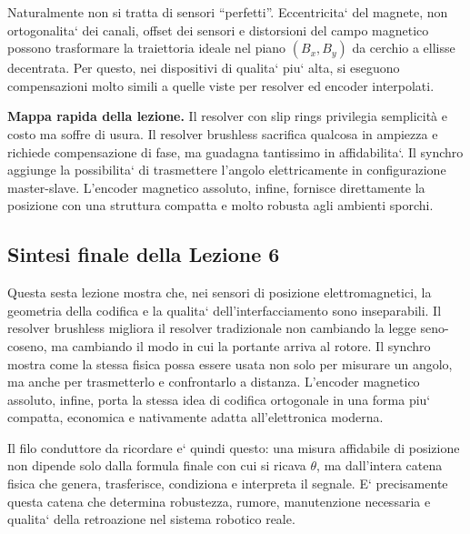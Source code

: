 \documentclass[11pt,a4paper]{article}
\begin{document}
Naturalmente non si tratta di sensori ``perfetti''. Eccentricita` del magnete, non ortogonalita` dei canali, offset dei sensori e distorsioni del campo magnetico possono trasformare la traiettoria ideale nel piano \((B_x,B_y)\) da cerchio a ellisse decentrata. Per questo, nei dispositivi di qualita` piu` alta, si eseguono compensazioni molto simili a quelle viste per resolver ed encoder interpolati.

\begin{keybox}
\textbf{Mappa rapida della lezione.} Il resolver con slip rings privilegia semplicit\`a e costo ma soffre di usura. Il resolver brushless sacrifica qualcosa in ampiezza e richiede compensazione di fase, ma guadagna tantissimo in affidabilita`. Il synchro aggiunge la possibilita` di trasmettere l’angolo elettricamente in configurazione master-slave. L’encoder magnetico assoluto, infine, fornisce direttamente la posizione con una struttura compatta e molto robusta agli ambienti sporchi.
\end{keybox}

\subsection*{Sintesi finale della Lezione 6}

Questa sesta lezione mostra che, nei sensori di posizione elettromagnetici, la geometria della codifica e la qualita` dell’interfacciamento sono inseparabili. Il resolver brushless migliora il resolver tradizionale non cambiando la legge seno-coseno, ma cambiando il modo in cui la portante arriva al rotore. Il synchro mostra come la stessa fisica possa essere usata non solo per misurare un angolo, ma anche per trasmetterlo e confrontarlo a distanza. L’encoder magnetico assoluto, infine, porta la stessa idea di codifica ortogonale in una forma piu` compatta, economica e nativamente adatta all’elettronica moderna.

Il filo conduttore da ricordare e` quindi questo: una misura affidabile di posizione non dipende solo dalla formula finale con cui si ricava \(\theta\), ma dall’intera catena fisica che genera, trasferisce, condiziona e interpreta il segnale. E` precisamente questa catena che determina robustezza, rumore, manutenzione necessaria e qualita` della retroazione nel sistema robotico reale.


\clearpage
\end{document}
